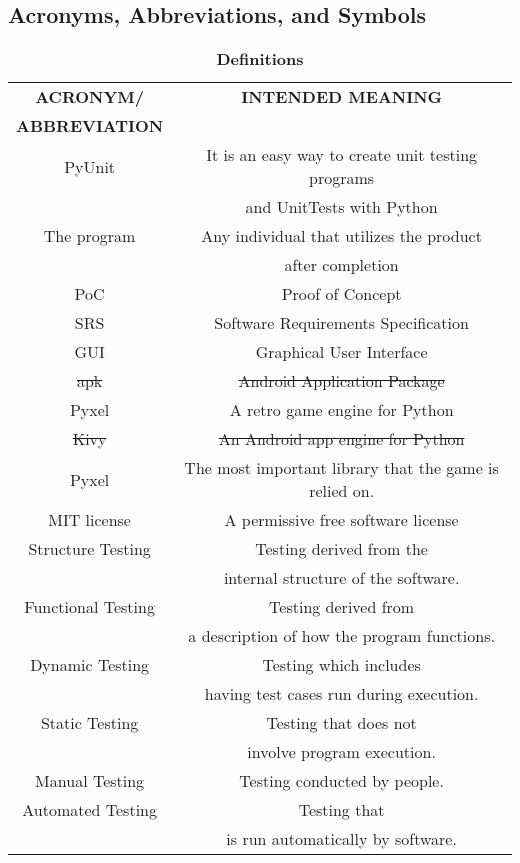 \documentclass[12pt, titlepage]{article}
\begin{document}
\subsection{Acronyms, Abbreviations, and Symbols}
	
\begin{table}[!h]
\caption{\bf Definitions}
\begin{tabular}{|c|c|}
    \hline
    \textbf{ACRONYM/}&\textbf{INTENDED MEANING} \\
    \textbf{ABBREVIATION}&\\
    \hline     
    PyUnit& It is an easy way to create unit testing programs\\
    & and UnitTests with Python \\
    \hline
    The program&Any individual that utilizes the product\\
    &after completion\\
    \hline
    PoC&Proof of Concept\\
    \hline
    SRS&Software Requirements Specification\\
    \hline
    GUI&Graphical User Interface\\
    \hline
    \sout{apk}&\sout{Android Application Package }\\
    \hline
    Pyxel&A retro game engine for Python\\
    \hline
    \sout{Kivy}&\sout{An Android app engine for Python}\\
    \hline
    {\color{red}Pyxel} & {\color{red}The most important library that the game is relied on.}\\
    \hline
    MIT license&A permissive free software license\\
    \hline
    Structure Testing&Testing derived from the\\
    & internal structure of the software.\\
    \hline
        Functional Testing&Testing derived from \\
        &a description of how the program functions.\\
    \hline
        Dynamic Testing&Testing which includes \\
        &having test cases run during execution.\\
    \hline
        Static Testing&Testing that does not\\
        & involve program execution.\\
    \hline
        Manual Testing&Testing conducted by people.\\
    \hline
        Automated Testing&Testing that\\
        & is run automatically by software.\\

    \hline
\end{tabular}
\end{table}
\end{document}
